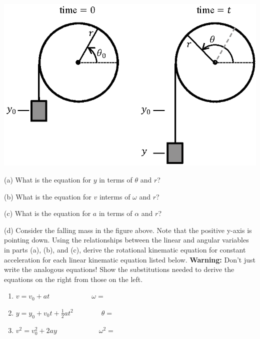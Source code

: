 \vspace{0.3cm}
{\par\centering \includegraphics[scale=0.9]{rotation/rotation_fig9_new.eps} \par}
\vspace{0.3cm}

(a) What is the equation for $y$ in terms of \( \theta  \) and $r$?
\vspace{7mm}

(b) What is the equation for $v$ interms of \( \omega  \) and $r$?
\vspace{7mm}

(c) What is the equation for $a$ in terms of \( \alpha  \) and $r$?
\vspace{7mm}

(d) Consider the falling mass in the figure above. Note that the positive 
y-axis is pointing down. Using the 
relationships between the linear and angular variables in parts (a), (b), and 
(c), derive the rotational kinematic equation for constant acceleration for 
each linear kinematic equation listed below. \textbf{Warning:} Don't just write
the analogous equations! Show the substitutions needed to derive the equations
on the right from those on the left.

\begin{enumerate}
\item \( v=v_{0}+at\qquad \qquad \qquad \omega = \)\vspace{20mm}

\item \( y=y_{0}+v_{0}t+\frac{1}{2}at^{2}\qquad \qquad \theta = \)\vspace{20mm}

\item \( v^{2}=v_{0}^{2}+2ay\qquad \qquad \qquad \omega ^{2}= \)
\end{enumerate}
